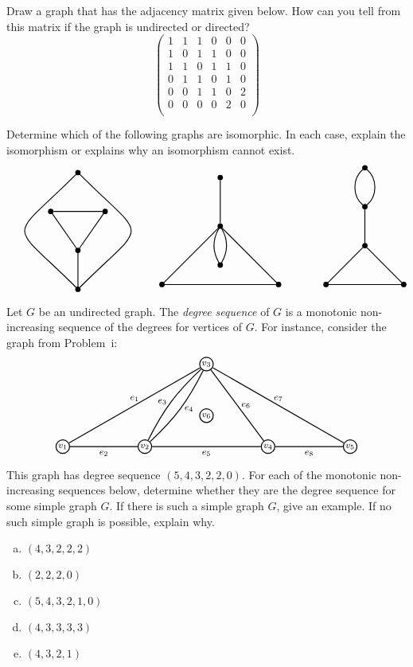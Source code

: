 \documentclass[11pt,letterpaper]{article}
\begin{document}
\newpage





 Draw a graph that has the adjacency matrix given below. How can you tell from this matrix if the graph is undirected or directed? 
	\[
	\begin{pmatrix}
	1 & 1 & 1 & 0 & 0 & 0 \\
	1 & 0 & 1 & 1 & 0 & 0 \\
	1 & 1 & 0 & 1 & 1 & 0 \\
	0 & 1 & 1 & 0 & 1 & 0 \\
	0 & 0 & 1 & 1 & 0 & 2 \\
	0 & 0 & 0 & 0 & 2 & 0 \\
	\end{pmatrix}
	\] \pspace





\newpage





 Determine which of the following graphs are isomorphic. In each case, explain the isomorphism or explains why an isomorphism cannot exist. \pspace
	\[
	\graphThree \quad \graphFour \qquad\qquad \graphFive
	\]





\newpage





 Let $G$ be an undirected graph. The \textit{degree sequence} of $G$ is a monotonic non-increasing sequence of the degrees for vertices of $G$. For instance, consider the graph from Problem~i: 
	\[
	\graphOne
	\]
This graph has degree sequence $(5, 4, 3, 2, 2, 0)$. For each of the monotonic non-increasing sequences below, determine whether they are the degree sequence for some simple graph $G$. If there is such a simple graph $G$, give an example. If no such simple graph is possible, explain why. 
	\begin{enumerate}[(a)]
	\item $(4, 3, 2, 2, 2)$
	\item $(2, 2, 2, 0)$
	\item $(5, 4, 3, 2, 1, 0)$ 
	\item $(4, 3, 3, 3, 3)$
	\item $(4, 3, 2, 1)$
	\end{enumerate} \pspace
\end{document}
